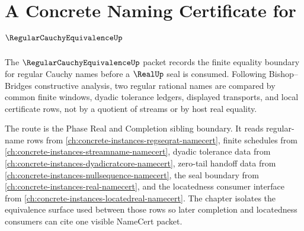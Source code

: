 \chapter{A Concrete Naming Certificate for $\RegularCauchyEquivalenceUp$}
\label{ch:concrete-instances-regularcauchyequivalence-namecert}

The $\RegularCauchyEquivalenceUp$ packet records the finite equality boundary for regular Cauchy names before a $\RealUp$ seal is consumed. Following Bishop--Bridges constructive analysis, two regular rational names are compared by common finite windows, dyadic tolerance ledgers, displayed transports, and local certificate rows, not by a quotient of streams or by host real equality.

The route is the Phase Real and Completion sibling boundary. It reads regular-name rows from \autoref{ch:concrete-instances-regseqrat-namecert}, finite schedules from \autoref{ch:concrete-instances-streamname-namecert}, dyadic tolerance data from \autoref{ch:concrete-instances-dyadicratcore-namecert}, zero-tail handoff data from \autoref{ch:concrete-instances-nullsequence-namecert}, the seal boundary from \autoref{ch:concrete-instances-real-namecert}, and the locatedness consumer interface from \autoref{ch:concrete-instances-locatedreal-namecert}. The chapter isolates the equivalence surface used between those rows so later completion and locatedness consumers can cite one visible NameCert packet.


